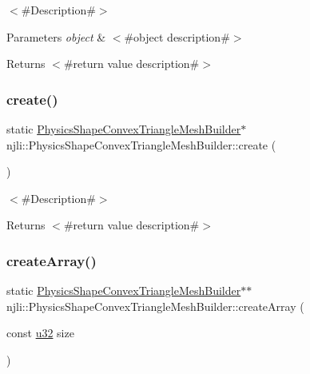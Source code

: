 $<$\#\+Description\#$>$


\begin{DoxyParams}{Parameters}
{\em object} & $<$\#object description\#$>$\\
\hline
\end{DoxyParams}
\begin{DoxyReturn}{Returns}
$<$\#return value description\#$>$ 
\end{DoxyReturn}
\mbox{\label{classnjli_1_1_physics_shape_convex_triangle_mesh_builder_ab54cd53cea3bb8901d3766f5f8d8f9ac}} 
\subsubsection{\texorpdfstring{create()}{create()}}
{\footnotesize\ttfamily static \mbox{\hyperlink{classnjli_1_1_physics_shape_convex_triangle_mesh_builder}{Physics\+Shape\+Convex\+Triangle\+Mesh\+Builder}}$\ast$ njli\+::\+Physics\+Shape\+Convex\+Triangle\+Mesh\+Builder\+::create (\begin{DoxyParamCaption}{ }\end{DoxyParamCaption})\hspace{0.3cm}{\ttfamily [static]}}

$<$\#\+Description\#$>$

\begin{DoxyReturn}{Returns}
$<$\#return value description\#$>$ 
\end{DoxyReturn}
\mbox{\label{classnjli_1_1_physics_shape_convex_triangle_mesh_builder_aecf73b56d238ebcf729bef55c465df76}} 
\subsubsection{\texorpdfstring{create\+Array()}{createArray()}}
{\footnotesize\ttfamily static \mbox{\hyperlink{classnjli_1_1_physics_shape_convex_triangle_mesh_builder}{Physics\+Shape\+Convex\+Triangle\+Mesh\+Builder}}$\ast$$\ast$ njli\+::\+Physics\+Shape\+Convex\+Triangle\+Mesh\+Builder\+::create\+Array (\begin{DoxyParamCaption}\item[{const \mbox{\hyperlink{_util_8h_a10e94b422ef0c20dcdec20d31a1f5049}{u32}}}]{size }\end{DoxyParamCaption})\hspace{0.3cm}{\ttfamily [static]}}

